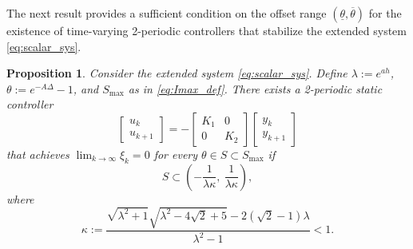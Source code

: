 \documentclass[letterpaper, 12pt, draftcls, onecolumn]{ieeeconf}
\newtheorem{proposition}[theorem]{Proposition}
\begin{document}
The next result provides a sufficient condition on the offset range
$(\underline \theta, \overline \theta)$
for the existence of time-varying
2-periodic controllers that 
stabilize the extended system \eqref{eq:scalar_sys}.
\begin{proposition}
	\label{prop:static_periodic}
	{\it
		Consider the extended system \eqref{eq:scalar_sys}.
		Define $\lambda := e^{ah}$, $\theta := e^{-A\Delta} - 1$,
		and $S_{\max}$ as in \eqref{eq:Imax_def}.
		There exists a 2-periodic static controller
		\begin{equation}
		\label{eq:class_periodic}
		\begin{bmatrix}
		u_k \\
		u_{k+1}
		\end{bmatrix}
		=
		-
		\begin{bmatrix}
		K_1 & 0 \\
		0 & K_2
		\end{bmatrix}
		\begin{bmatrix}
		y_k \\
		y_{k+1}
		\end{bmatrix}
		\end{equation}
		that achieves $\lim_{k \to \infty}\xi_k = 0$
		for every $\theta \in S \subset S_{\max}$
		if
		\begin{equation}
		\label{eq:2peridic_bound}
		S \subset 
		\left(
		-\frac{1}{\lambda\kappa},~
		\frac{1}{\lambda\kappa}
		\right),
		\end{equation}
		where 
		\begin{equation*}
		\label{def:kappa}
		\kappa := 
		\frac{\sqrt{\lambda^2 + 1} \sqrt{\lambda^2 - 4\sqrt{2} +5} - 2
			\left(\sqrt{2} - 1
			\right)\lambda}{\lambda^2 - 1} < 1.
		\end{equation*}
	}
\end{proposition}
\end{document}
